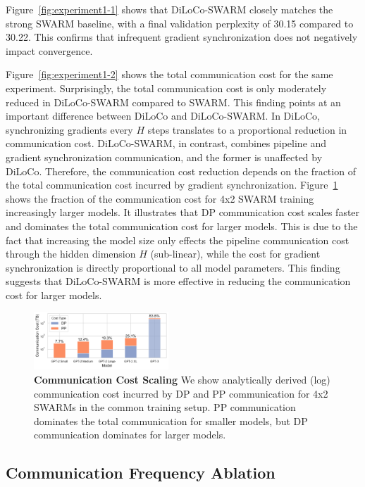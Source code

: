 \documentclass{article}
\begin{document}
Figure~\ref{fig:experiment1-1} shows that DiLoCo-SWARM closely matches the strong SWARM baseline, with a final validation perplexity of 30.15 compared to 30.22. This confirms that infrequent gradient synchronization does not negatively impact convergence.

Figure~\ref{fig:experiment1-2} shows the total communication cost for the same
experiment. Surprisingly, the total communication cost is only moderately reduced in DiLoCo-SWARM compared to SWARM. This finding points at an important difference between DiLoCo and DiLoCo-SWARM. In DiLoCo, synchronizing gradients every $H$  steps translates to a proportional reduction in communication cost. DiLoCo-SWARM, in contrast, combines pipeline and gradient synchronization communication, and the former is unaffected by DiLoCo. Therefore, the communication cost reduction depends on the fraction of the total communication cost incurred by gradient synchronization. Figure~\ref{fig:communication-cost-scaling} shows the fraction of the communication cost for 4x2 SWARM training increasingly larger models. It illustrates that DP communication cost scales faster and dominates the total communication cost for larger models. This is due to the fact that increasing the model size only effects the pipeline communication cost through the hidden dimension $H$ (sub-linear), while the cost for gradient synchronization is directly proportional to all model parameters. This finding suggests that DiLoCo-SWARM is more effective in reducing the communication cost for larger models.

\begin{figure}[ht]
  \centering
  \includegraphics[width=0.45\textwidth]{figures/communication-cost-scaling.pdf}
  \caption{\textbf{Communication Cost Scaling} We show analytically derived
  (log) communication cost incurred by DP and PP communication for 4x2 SWARMs in
  the common training setup. PP communication dominates the total communication
  for smaller models, but DP communication dominates for larger models.} 
  \label{fig:communication-cost-scaling}
\end{figure}

\subsection{Communication Frequency Ablation}
\end{document}
